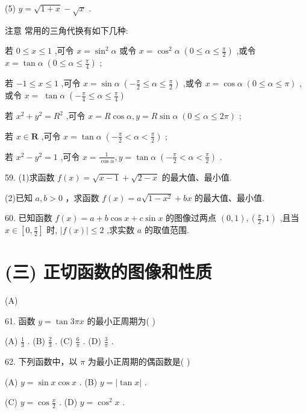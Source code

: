 \documentclass[10pt]{article}
\begin{document}
(5) \(y = \sqrt{1 + x} - \sqrt{x}\) .

注意 常用的三角代换有如下几种:

若 \(0 \leq  x \leq  1\) ,可令 \(x = {\sin }^{2}\alpha\) 或令 \(x = {\cos }^{2}\alpha \;\left( {0 \leq  \alpha  \leq  \frac{\pi }{2}}\right)\) ,或令 \(x = \tan \alpha \;\left( {0 \leq  \alpha  \leq  \frac{\pi }{4}}\right)\) ;

若 \(- 1 \leq  x \leq  1\) ,可令 \(x = \sin \alpha \;\left( {-\frac{\pi }{2} \leq  \alpha  \leq  \frac{\pi }{2}}\right)\) ,或令 \(x = \cos \alpha \;\left( {0 \leq  \alpha  \leq  \pi }\right)\) ,或令 \(x = \; \tan \alpha \;\left( {-\frac{\pi }{4} \leq  \alpha  \leq  \frac{\pi }{4}}\right)\)

若 \({x}^{2} + {y}^{2} = {R}^{2}\) ,可令 \(x = R\cos \alpha ,y = R\sin \alpha \;\left( {0 \leq  \alpha  \leq  {2\pi }}\right)\) ;

若 \(x \in  \mathbf{R}\) ,可令 \(x = \tan \alpha \;\left( {-\frac{\pi }{2} < \alpha  < \frac{\pi }{2}}\right)\) ;

若 \({x}^{2} - {y}^{2} = 1\) ,可令 \(x = \frac{1}{\cos \alpha },y = \tan \alpha \;\left( {-\frac{\pi }{2} < \alpha  < \frac{\pi }{2}}\right)\) .

59. (1)求函数 \(f\left( x\right)  = \sqrt{x - 1} + \sqrt{2 - x}\) 的最大值、最小值.

(2)已知 \(a,b > 0\) ，求函数 \(f\left( x\right)  = a\sqrt{1 - {x}^{2}} + {bx}\) 的最大值、最小值.

60. 已知函数 \(f\left( x\right)  = a + b\cos x + c\sin x\) 的图像过两点 \(\left( {0,1}\right) ,\left( {\frac{\pi }{2},1}\right)\) ,且当 \(x \in  \left\lbrack  {0,\frac{\pi }{2}}\right\rbrack\) 时, \(\left| {f\left( x\right) }\right|  \leq  2\) ,求实数 \(a\) 的取值范围.

\section*{(三) 正切函数的图像和性质}

(A)

61. 函数 \(y = \tan {3\pi x}\) 的最小正周期为( )

(A) \(\frac{1}{3}\) . (B) \(\frac{2}{3}\) . (C) \(\frac{6}{\pi }\) . (D) \(\frac{3}{\pi }\) .

62. 下列函数中，以 \(\pi\) 为最小正周期的偶函数是( )

(A) \(y = \sin x\cos x\) . (B) \(y = \left| {\tan x}\right|\) .

(C) \(y = \cos \frac{x}{2}\) . (D) \(y = {\cos }^{2}x\) .
\end{document}
